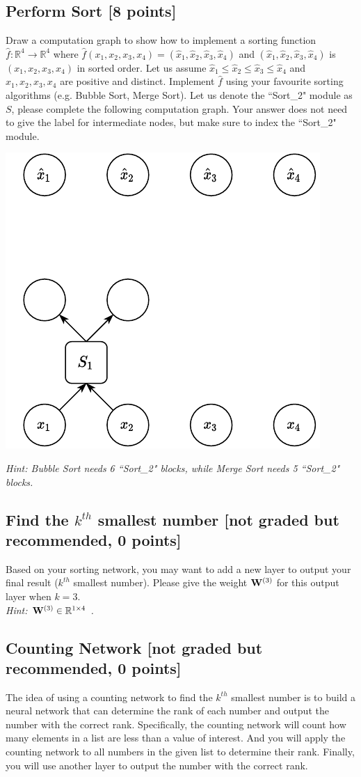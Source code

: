 \documentclass[11pt]{article}
\newcommand{\R}{\mathbb{R}} %
\begin{document}
    
    \subsection{Perform Sort {\color{blue}[8 points]}}\label{sec:perform_sort}
        Draw a computation graph to show how to implement a sorting function $\hat{f}:\R^4 \to \R^4$ where $\hat{f}(x_1, x_2, x_3, x_4) = (\hat{x}_1, \hat{x}_2, \hat{x}_3, \hat{x}_4)$ and $(\hat{x}_1, \hat{x}_2, \hat{x}_3, \hat{x}_4)$ is $(x_1, x_2, x_3, x_4)$ in sorted order.
        Let us assume $\hat{x}_1 \leq \hat{x}_2 \leq \hat{x}_3 \leq \hat{x}_4$ and $x_1, x_2, x_3, x_4$ are positive and distinct. Implement $\hat{f}$ using your favourite sorting algorithms (e.g. Bubble Sort, Merge Sort). Let us denote the ``Sort\_2" module as $S$, please complete the following computation graph. Your answer does not need to give the label for intermediate nodes, but make sure to index the ``Sort\_2" module.
        
        \begin{center}
            \includegraphics[width=0.3 \textwidth]{figures/q1.2.pdf}
        \end{center}
        
        \noindent \emph{Hint: Bubble Sort needs 6 ``Sort\_2" blocks, while Merge Sort needs 5 ``Sort\_2" blocks.}
    
    
    \subsection{Find the $k^{th}$ smallest number {[not graded but recommended, 0 points]}}
    Based on your sorting network, you may want to add a new layer to output your final result ($k^{th}$ smallest number). Please give the weight $\mathbf{W}^{(3)}$ for this output layer when $k=3$. \\
    
    \noindent \emph{Hint: $\mathbf{W}^{(3)} \in \mathbb{R}^{1 \times 4}$ .}

    \subsection{Counting Network {[not graded but recommended, 0 points]}}
    The idea of using a counting network to find the $k^{th}$ smallest number is to build a neural network that can determine the rank of each number and output the number with the correct rank. 
    Specifically, the counting network will count how many elements in a list are less than a value of interest. And you will apply the counting network to all numbers in the given list to determine their rank. Finally, you will use another layer to output the number with the correct rank.
    
\end{document}
